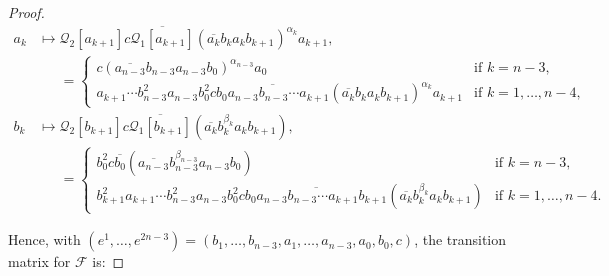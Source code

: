 \documentclass[11pt, letterpaper]{amsart}
\theoremstyle{plain}
\theoremstyle{definition}
\newcommand{\cQ}{\mathcal{Q}}
\newcommand{\calF}{\mathcal{F}}
\newcommand{\ov}[1]{\overline{#1}}
\begin{document}
\begin{proof}
\begin{align*}
    a_k &\longmapsto \cQ_2[a_{k+1}]c\ov{\cQ_1[a_{k+1}]}\left(\ov{a_{k}}b_{k}a_{k}b_{k+1}\right)^{\alpha_k}a_{k+1},\\
    &\phantom{\!\mapsto}=
    \begin{cases}
        c\left(\ov{a_{n-3}}b_{n-3}a_{n-3}b_{0}\right)^{\alpha_{n-3}}a_{0} & \text{if $k=n-3$,}\\
        a_{k+1}\cdots b_{n-3}^2a_{n-3}b_{0}^2c\ov{b_{0}a_{n-3}b_{n-3}\cdots a_{k+1}}\left(\ov{a_{k}}b_{k}a_{k}b_{k+1}\right)^{\alpha_k}a_{k+1} & \text{if $k=1,\ldots,n-4,$}
    \end{cases}\\
    b_k &\longmapsto \cQ_2[b_{k+1}]c\ov{\cQ_1[b_{k+1}]}\left(\ov{a_{k}}b_{k}^{\beta_{k}}a_{k}b_{k+1}\right),\\
    &\phantom{\!\mapsto}=
    \begin{cases}
        b_{0}^2c\ov{b_{0}}\left(\ov{a_{n-3}}b_{n-3}^{\beta_{n-3}}a_{n-3}b_{0}\right) & \text{if $k=n-3$},\\
        b_{k+1}^2a_{k+1}\cdots b_{n-3}^2a_{n-3}b_{0}^2c\ov{b_{0}a_{n-3}b_{n-3}\cdots a_{k+1}b_{k+1}}\left(\ov{a_{k}}b_{k}^{\beta_{k}}a_{k}b_{k+1}\right) & \text{if $k=1,\ldots,n-4.$}
    \end{cases}
\end{align*}

Hence, with $(e^1,\ldots,e^{2n-3})=(b_1,\ldots,b_{n-3},a_1,\ldots,a_{n-3},a_0,b_0,c)$, the transition matrix for $\calF$ is:


\end{proof}
\end{document}
